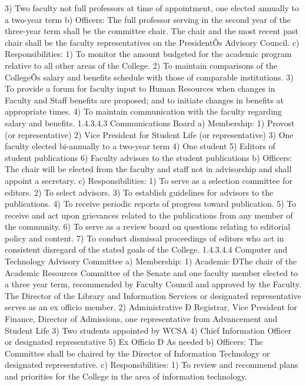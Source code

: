\documentclass[letterpaper, 11pt]{article}
\begin{document}
3) Two faculty not full professors at time of appointment, one elected annually to a two-year term
b) Officers:
   The full professor serving in the second year of the three-year term shall be the committee chair.  The chair and the most recent past chair shall be the faculty representatives on the PresidentÕs Advisory Council.
c) Responsibilities:
1) To monitor the amount budgeted for the academic program relative to all other areas of the College.
2) To maintain comparisons of the CollegeÕs salary and benefits schedule with those of comparable institutions.
3) To provide a forum for faculty input to Human Resources when changes in Faculty and Staff benefits are proposed; and to initiate changes in benefits at appropriate times.
4) To maintain communication with the faculty regarding salary and benefits.
1.4.3.4.3 Communications Board
a) Membership:
1) Provost (or representative)
2) Vice President for Student Life (or representative)
3) One faculty elected bi-annually to a two-year term
4) One student
5) Editors of student publications
6) Faculty advisors to the student publications
b) Officers:
   The chair will be elected from the faculty and staff not in advisorship and shall appoint a secretary.
c) Responsibilities:
1) To serve as a selection committee for editors.
2) To select advisors.
3) To establish guidelines for advisors to the publications.
4) To receive periodic reports of progress toward publication.
5) To receive and act upon grievances related to the publications from any member of the community.
6) To serve as a review board on questions relating to editorial policy and content.
7) To conduct dismissal proceedings of editors who act in consistent disregard of the stated goals of the College.
1.4.3.4.4 Computer and Technology Advisory Committee
a) Membership:
1) Academic ÐThe chair of the Academic Resources Committee of the Senate and one faculty member elected to a three year term, recommended by Faculty Council and approved by the Faculty.  The Director of the Library and Information Services or designated representative serves as an ex officio member.
2) Administrative Ð Registrar, Vice President for Finance, Director of Admissions, one representative from Advancement and Student Life
3) Two students appointed by WCSA
4) Chief Information Officer or designated representative
5) Ex Officio Ð As needed
b) Officers:
   The Committee shall be chaired by the Director of Information Technology or designated representative.
c) Responsibilities:
1) To review and recommend plans and priorities for the College in the area of information technology.
\end{document}
